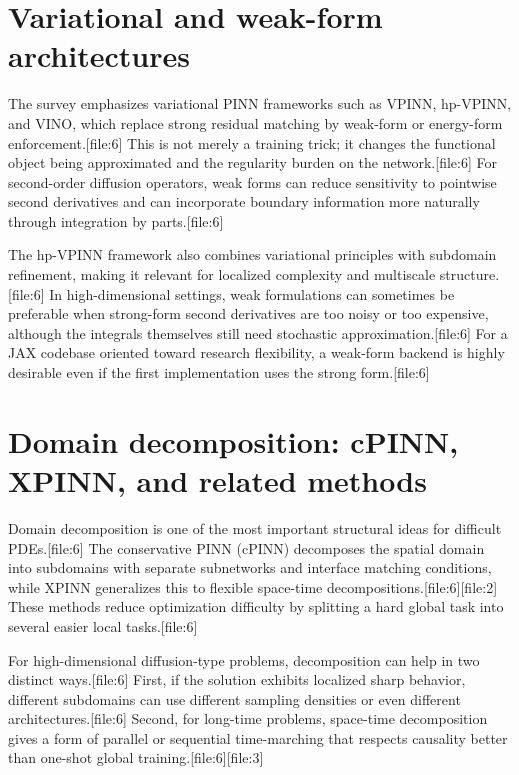 \documentclass[11pt]{report}
\begin{document}
\section{Variational and weak-form architectures}

The survey emphasizes variational PINN frameworks such as VPINN, hp-VPINN, and VINO, which replace strong residual matching by weak-form or energy-form enforcement.[file:6]  
This is not merely a training trick; it changes the functional object being approximated and the regularity burden on the network.[file:6]  
For second-order diffusion operators, weak forms can reduce sensitivity to pointwise second derivatives and can incorporate boundary information more naturally through integration by parts.[file:6]

The hp-VPINN framework also combines variational principles with subdomain refinement, making it relevant for localized complexity and multiscale structure.[file:6]  
In high-dimensional settings, weak formulations can sometimes be preferable when strong-form second derivatives are too noisy or too expensive, although the integrals themselves still need stochastic approximation.[file:6]  
For a JAX codebase oriented toward research flexibility, a weak-form backend is highly desirable even if the first implementation uses the strong form.[file:6]

\section{Domain decomposition: cPINN, XPINN, and related methods}

Domain decomposition is one of the most important structural ideas for difficult PDEs.[file:6]  
The conservative PINN (cPINN) decomposes the spatial domain into subdomains with separate subnetworks and interface matching conditions, while XPINN generalizes this to flexible space-time decompositions.[file:6][file:2]  
These methods reduce optimization difficulty by splitting a hard global task into several easier local tasks.[file:6]

For high-dimensional diffusion-type problems, decomposition can help in two distinct ways.[file:6]  
First, if the solution exhibits localized sharp behavior, different subdomains can use different sampling densities or even different architectures.[file:6]  
Second, for long-time problems, space-time decomposition gives a form of parallel or sequential time-marching that respects causality better than one-shot global training.[file:6][file:3]
\end{document}
